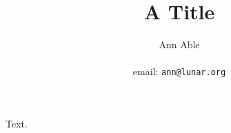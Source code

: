 \documentclass{amsart}
\author{Ann Able\\
{\footnotesize \institution\\
email: \texttt{ann@lunar.org}}}
\begin{document}
\title{A Title}
\maketitle
Text.
\end{document}
